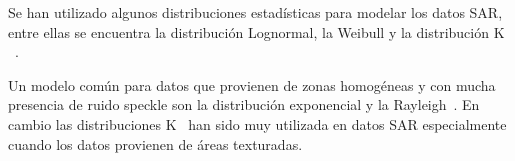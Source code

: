
Se han utilizado algunos distribuciones estadísticas para modelar los datos SAR, entre ellas se encuentra la distribución Lognormal, la Weibull y la distribución $\mathrm{K}$~\cite{Lee2009}. 

Un modelo común para datos que provienen de zonas homogéneas y con mucha presencia de ruido speckle son la distribución exponencial y la Rayleigh~\cite{Frery97}. En cambio las distribuciones $\mathrm{K}$~\cite{Jakeman87} han sido muy utilizada en datos SAR especialmente cuando los datos provienen de áreas texturadas. 


